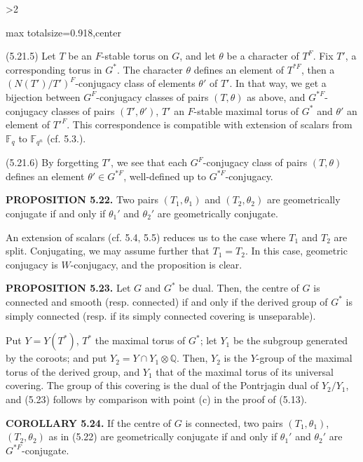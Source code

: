 \documentclass[9pt,twoside]{extarticle}
\newcommand{\EditionPage}[3]{%
  \ifnum#1>2\clearpage\fi
  \pdfbookmark[1]{Printed page #2}{en-folio-#2}%
  \hypertarget{en-physical-#1}{}%
  \noindent\begin{adjustbox}{max totalsize={\textwidth}{0.918\textheight},center}
  \begin{minipage}[t]{\textwidth}
  \fontsize{9.4}{11.1}\selectfont\justifying
  #3
  \end{minipage}
  \end{adjustbox}%
}
\begin{document}
\EditionPage{33}{134}{%
(5.21.5) Let \(T\) be an \(F\)-stable torus on \(G\), and let \(\theta\) be a character of \(T^F\). Fix \(T'\), a corresponding torus in \(G^*\). The character \(\theta\) defines an element of \(T^{*F}\), then a \((N(T')/T')^F\)-conjugacy class of elements \(\theta'\) of \(T'\). In that way, we get a bijection between \(G^F\)-conjugacy classes of pairs \((T,\theta)\) as above, and \(G^{*F}\)-conjugacy classes of pairs \((T',\theta')\), \(T'\) an \(F\)-stable maximal torus of \(G^*\) and \(\theta'\) an element of \(T'^F\). This correspondence is compatible with extension of scalars from \(\mathbb F_q\) to \(\mathbb F_{q^n}\) (cf. 5.3.).\par

(5.21.6) By forgetting \(T'\), we see that each \(G^F\)-conjugacy class of pairs \((T,\theta)\) defines an element \(\theta'\in G^{*F}\), well-defined up to \(G^{*F}\)-conjugacy.\par

\noindent\textbf{PROPOSITION 5.22.} Two pairs \((T_1,\theta_1)\) and \((T_2,\theta_2)\) are geometrically conjugate if and only if \(\theta_1'\) and \(\theta_2'\) are geometrically conjugate.\par

An extension of scalars (cf. 5.4, 5.5) reduces us to the case where \(T_1\) and \(T_2\) are split. Conjugating, we may assume further that \(T_1=T_2\). In this case, geometric conjugacy is \(W\)-conjugacy, and the proposition is clear.\par

\noindent\textbf{PROPOSITION 5.23.} Let \(G\) and \(G^*\) be dual. Then, the centre of \(G\) is connected and smooth (resp. connected) if and only if the derived group of \(G^*\) is simply connected (resp. if its simply connected covering is unseparable).\par

Put \(Y=Y(T^*)\), \(T^*\) the maximal torus of \(G^*\); let \(Y_1\) be the subgroup generated by the coroots; and put \(Y_2=Y\cap Y_1\otimes\mathbb Q\). Then, \(Y_2\) is the \(Y\)-group of the maximal torus of the derived group, and \(Y_1\) that of the maximal torus of its universal covering. The group of this covering is the dual of the Pontrjagin dual of \(Y_2/Y_1\), and (5.23) follows by comparison with point (c) in the proof of (5.13).\par

\noindent\textbf{COROLLARY 5.24.} If the centre of \(G\) is connected, two pairs \((T_1,\theta_1)\), \((T_2,\theta_2)\) as in (5.22) are geometrically conjugate if and only if \(\theta_1'\) and \(\theta_2'\) are \(G^{*F}\)-conjugate.\par

}
\end{document}
